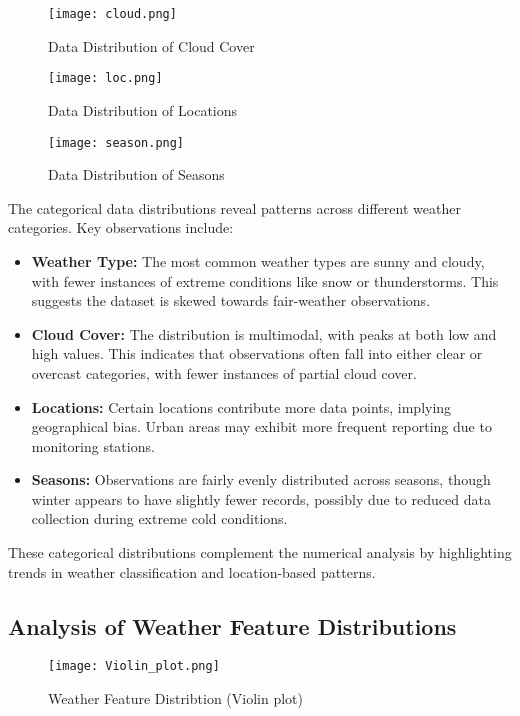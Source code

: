 \documentclass{article}
\begin{document}
\begin{figure}[H]
    \centering
    \texttt{[image: cloud.png]}
    \caption{Data Distribution of Cloud Cover}
\end{figure}

\begin{figure}[H]
    \centering
    \texttt{[image: loc.png]}
    \caption{Data Distribution of Locations}
\end{figure}

\begin{figure}[H]
    \centering
    \texttt{[image: season.png]}
    \caption{Data Distribution of Seasons}
\end{figure}

The categorical data distributions reveal patterns across different weather categories. Key observations include:

\begin{itemize}
\item \textbf{Weather Type:} The most common weather types are sunny and cloudy, with fewer instances of extreme conditions like snow or thunderstorms. This suggests the dataset is skewed towards fair-weather observations.

\item \textbf{Cloud Cover:} The distribution is multimodal, with peaks at both low and high values. This indicates that observations often fall into either clear or overcast categories, with fewer instances of partial cloud cover.

\item \textbf{Locations:} Certain locations contribute more data points, implying geographical bias. Urban areas may exhibit more frequent reporting due to monitoring stations.

\item \textbf{Seasons:} Observations are fairly evenly distributed across seasons, though winter appears to have slightly fewer records, possibly due to reduced data collection during extreme cold conditions.
\end{itemize}

These categorical distributions complement the numerical analysis by highlighting trends in weather classification and location-based patterns.

\subsection{Analysis of Weather Feature Distributions}
\begin{figure}[H]
    \centering
    \texttt{[image: Violin\_plot.png]}
    \caption{Weather Feature Distribtion (Violin plot)}
\end{figure}
\end{document}
